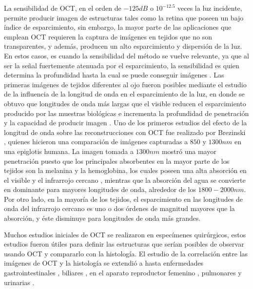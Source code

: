 La sensibilidad de OCT, en el orden de $-125dB$ o $10^{-12.5}$ veces la luz incidente, permite producir imagen de estructuras tales como la retina que poseen un bajo índice de esparcimiento, sin embargo, la mayor parte de las aplicaciones que emplean OCT requieren la captura de imágenes en tejidos que no son transparentes, y además, producen un alto esparcimiento y dispersión de la luz. En estos casos, es cuando la sensibilidad del método se vuelve relevante, ya que al ser la señal fuertemente atenuada por el esparcimiento, la sensibilidad es quien determina la profundidad hasta la cual se puede conseguir imágenes \cite{Drexler2015}. Las primeras imágenes de tejidos diferentes al ojo fueron posibles mediante el estudio de la influencia de la longitud de onda en el esparcimiento de la luz, en donde se obtuvo que longitudes de onda más largas que el visible reducen el esparcimiento producido por las muestras biológicas e incrementa la profundidad de penetración y la capacidad de producir imagen \cite{Brezinski1996, Schuman1995}. Uno de los primeros estudios del efecto de la longitud de onda sobre las reconstrucciones con OCT fue realizado por Brezinski \etal \cite{Brezinski1996}, quienes hicieron una comparación de imágenes capturadas a $850$ y $1300nm$ \exvivo en una epiglotis humana. La imagen tomada a $1300nm$ mostró una mayor penetración puesto que los principales absorbentes en la mayor parte de los tejidos son la melanina y la hemoglobina, los cuales poseen una alta absorción en el visible y el infrarrojo cercano \cite{Parsa1989}, mientras que la absorción del agua se convierte en dominante para mayores longitudes de onda, alrededor de los $1800-2000nm$. Por otro lado, en la mayoría de los tejidos, el esparcimiento en las longitudes de onda del infrarrojo cercano es uno o dos órdenes de magnitud mayores que la absorción, y éste disminuye para longitudes de onda más grandes.


Muchos estudios iniciales de OCT se realizaron \exvivo en especímenes quirúrgicos, estos estudios fueron útiles para definir las estructuras que serían posibles de observar usando OCT \cite{Brezinski1996} y compararlo con la histología. El estudio de la correlación entre las imágenes \exvivo de OCT y la histología se extendió a hasta enfermedades gastrointestinales \cite{Izatt1996, Tearney1997, Kobayashi1998, Pitris2000}, biliares \cite{Tearney1998}, en el aparato reproductor femenino \cite{Pitris1999}, pulmonares \cite{Pitris1998} y urinarias \cite{Tearney1997}.



